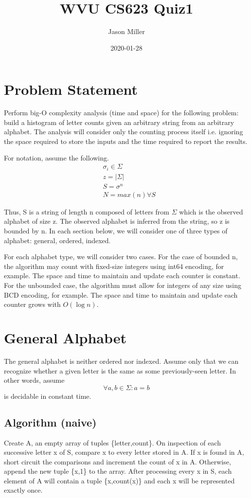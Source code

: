 \documentclass{article}
\title{WVU CS623 Quiz1}
\date{2020-01-28}
\author{Jason Miller}
\begin{document}
\maketitle
{}
\begin{multicols}{2}
\section{Problem Statement}
Perform big-O complexity analysis (time and space) for the following problem:
build a histogram of letter counts given an arbitrary string from an arbitrary alphabet.
The analysis will consider only the counting process itself
i.e. ignoring the space required to store the inputs and the time required to report the results.

For notation, assume the following.
\begin{align*} 
    &\sigma_{i} \in \Sigma \\
    &z = | \Sigma | \\
    &S = \sigma^n  \\
    &N = max(n) \forall S
\end{align*} 

Thus, S is a string of length n composed of letters from $\Sigma$ which is the observed alphabet of size z. 
The observed alphabet is inferred from the string, so z is bounded by n.
In each section below, we will consider one of three types of alphabet: general, ordered, indexed.

For each alphabet type, we will consider two cases. 
For the case of bounded n, the algorithm may count with fixed-size integers using int64 encoding, for example.
The space and time to maintain and update each counter is constant.
For the unbounded case, the algorithm must allow for integers of any size using BCD encoding, for example.
The space and time to maintain and update each counter grows with $O(\log{}n)$.
\section{General Alphabet}
The general alphabet is neither ordered nor indexed. 
Assume only that we can recognize whether a given letter is the same as some previously-seen letter. 
In other words, assume
\begin{equation*}
    \forall a,b  \in \Sigma : a = b 
\end{equation*}
is decidable in constant time.
\subsection{Algorithm (naive)}
Create A, an empty array of tuples \{letter,count\}.
On inspection of each successive letter x of S, compare x to every letter stored in A.
If x is found in A, short circuit the comparisons and increment the count of x in A.
Otherwise, append the new tuple \{x,1\} to the array.
After processing every x in S, each element of A will contain a tuple \{x,count(x)\}
and each x will be represented exactly once. 

\end{multicols}
\end{document}
